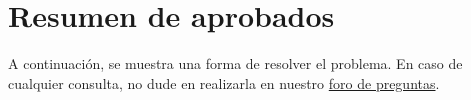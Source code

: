 \section{Resumen de aprobados}

A continuación, se muestra una forma de resolver el problema. En caso de cualquier consulta, no dude en realizarla en nuestro \href{https://aula.usm.cl/mod/forum/view.php?id=2654494}{foro de preguntas}.


